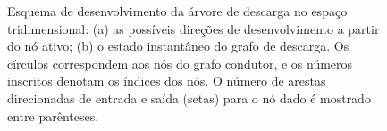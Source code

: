 \documentclass[a4paper, 12pt, onecolumn,singlespacing]{article}
\begin{document}
	\begin{figure}[!h]
		\caption{Esquema de desenvolvimento da árvore de descarga no espaço tridimensional: (a) as possíveis direções de desenvolvimento a partir do nó ativo; (b) o estado instantâneo do grafo de descarga. Os círculos correspondem aos nós do grafo condutor, e os números inscritos denotam os índices dos nós. O número de arestas direcionadas de entrada e saída (setas) para o nó dado é mostrado entre parênteses.}
		\label{componente_m}
		\hfill
		
	\end{figure}
	
\end{document}

